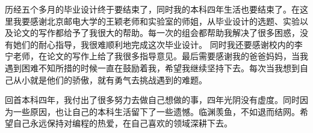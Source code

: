 \begin{acknowledgements}
历经五个多月的毕业设计终于要结束了，同时我的本科四年生活也要结束了。在这里我要感谢北京邮电大学的王颖老师和实验室的师姐，从毕业设计的选题、实验以及论文的写作都给予了我很大的帮助。每一次的组会都帮助我解决了很多困惑，没有她们的耐心指导，我很难顺利地完成这次毕业设计。 同时我还要感谢校内的李宁老师，在论文的写作上给了我很多指导意见。最后需要感谢我的爸爸妈妈，当我遇到困难不知所措的时候一直在鼓励着我，希望我继续坚持下去。每次当我想到自己从小就是他们的骄傲，就有勇气去挑战遇到的难题。\par
回首本科四年，我付出了很多努力去做自己想做的事，四年光阴没有虚度。同时因为一些原因，也让自己的本科生活留下了一些遗憾。临渊羡鱼，不如退而结网。希望自己永远保持对编程的热爱，在自己喜欢的领域深耕下去。


\end{acknowledgements}
